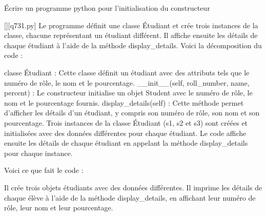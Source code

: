         \question
        Écrire un programme python pour l'initialisation du constructeur
        \par
        \begin{solution}
            \renewcommand{\nomfichier}{q731.py}
            \pythonfile{\chemincode \nomfichier}[][\nomfichier]
            Le programme définit une classe Étudiant et crée trois instances de la classe, chacune représentant un étudiant différent. Il affiche ensuite les détails de chaque étudiant à l'aide de la méthode display\_details. Voici la décomposition du code :

    classe Étudiant : Cette classe définit un étudiant avec des attributs tels que le numéro de rôle, le nom et le pourcentage.
    \_\_init\_\_(self, roll\_number, name, percent) : Le constructeur initialise un objet Student avec le numéro de rôle, le nom et le pourcentage fournis.
    display\_details(self) : Cette méthode permet d'afficher les détails d'un étudiant, y compris son numéro de rôle, son nom et son pourcentage.
    Trois instances de la classe Étudiant (s1, s2 et s3) sont créées et initialisées avec des données différentes pour chaque étudiant.
    Le code affiche ensuite les détails de chaque étudiant en appelant la méthode display\_details pour chaque instance.

Voici ce que fait le code :

    Il crée trois objets étudiants avec des données différentes.
    Il imprime les détails de chaque élève à l'aide de la méthode display\_details, en affichant leur numéro de rôle, leur nom et leur pourcentage.
        \end{solution}
        

